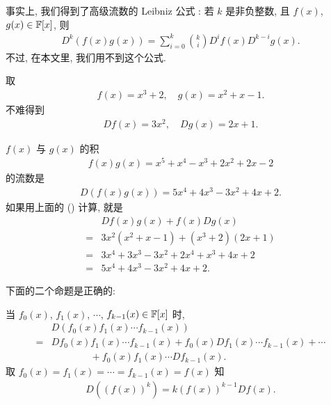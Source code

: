 \begin{remark}
    事实上, 我们得到了高级流数的 Leibniz 公式 : 若 $k$ 是非负整数, 且 $f(x)$, $g(x) \in \mathbb{F}[x]$, 则
    \begin{align*}
        D^k (f(x)g(x)) = \sum_{i = 0}^{k} \binom{k}{i} D^i f(x) D^{k-i} g(x).
    \end{align*}
    不过, 在本文里, 我们用不到这个公式.
\end{remark}

\begin{example}
    取
    \begin{align*}
        f(x) = x^3 + 2, \quad g(x) = x^2 + x - 1.
    \end{align*}
    不难得到
    \begin{align*}
        Df (x) = 3x^2, \quad Dg (x) = 2x + 1.
    \end{align*}

    $f(x)$ 与 $g(x)$ 的积
    \begin{align*}
        f(x) g(x) = x^5 + x^4 - x^3 + 2x^2 + 2x - 2
    \end{align*}
    的流数是
    \begin{align*}
        D(f(x) g(x)) = 5x^4 + 4x^3 - 3x^2 + 4x + 2.
    \end{align*}
    如果用上面的 (\myStar) 计算, 就是
    \begin{align*}
             & Df (x) g(x) + f(x) Dg (x)                \\
        = {} & 3x^2 (x^2 + x - 1) + (x^3 + 2) (2x + 1)  \\
        = {} & 3x^4 + 3x^3 - 3x^2 + 2x^4 + x^3 + 4x + 2 \\
        = {} & 5x^4 + 4x^3 - 3x^2 + 4x + 2.
    \end{align*}
\end{example}

下面的二个命题是正确的:

\begin{proposition}
    当 $f_0 (x)$, $f_1 (x)$, $\cdots$, $f_{k-1} (x) \in \mathbb{F}[x]$ 时,
    \begin{align*}
             & D(f_0 (x) f_1 (x) \cdots f_{k-1} (x))                                              \\
        = {} & Df_0 (x) f_1 (x) \cdots f_{k-1} (x) + f_0 (x) Df_1 (x) \cdots f_{k-1} (x) + \cdots \\
             & \qquad \qquad + f_0 (x) f_1 (x) \cdots Df_{k-1} (x).
    \end{align*}
    取 $f_0 (x) = f_1 (x) = \cdots = f_{k-1} (x) = f(x)$ 知
    \begin{align*}
        D((f(x))^k) = k(f(x))^{k-1} Df(x).
    \end{align*}
\end{proposition}

